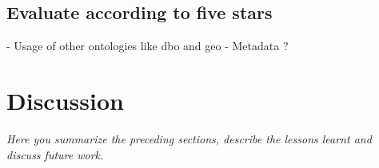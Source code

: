 \documentclass[runningheads,a4paper]{../../StyleFiles/llncs}
\begin{document}
\subsection{Evaluate according to five stars}
- Usage of other ontologies like dbo and geo
- Metadata ?

\section{Discussion}
\textit{Here you summarize the preceding sections, describe the lessons learnt and discuss future work.}





\end{document}
